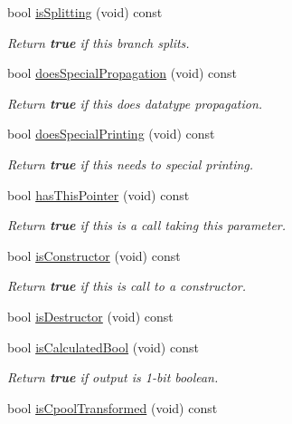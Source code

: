 \begin{DoxyCompactItemize}
bool \mbox{\hyperlink{class_pcode_op_a3a3c03bf005cafa3f295251b742423b4}{is\+Splitting}} (void) const
\begin{DoxyCompactList}\small\item\em Return {\bfseries{true}} if this branch splits. \end{DoxyCompactList}\item 
bool \mbox{\hyperlink{class_pcode_op_a746fabce57a6add33b424b291954f1f8}{does\+Special\+Propagation}} (void) const
\begin{DoxyCompactList}\small\item\em Return {\bfseries{true}} if this does datatype propagation. \end{DoxyCompactList}\item 
bool \mbox{\hyperlink{class_pcode_op_a71b48612b17f981218d84fd105b42223}{does\+Special\+Printing}} (void) const
\begin{DoxyCompactList}\small\item\em Return {\bfseries{true}} if this needs to special printing. \end{DoxyCompactList}\item 
bool \mbox{\hyperlink{class_pcode_op_a9f12117eb8561e7926ab04fdf2a05073}{has\+This\+Pointer}} (void) const
\begin{DoxyCompactList}\small\item\em Return {\bfseries{true}} if this is a call taking \textquotesingle{}this\textquotesingle{} parameter. \end{DoxyCompactList}\item 
bool \mbox{\hyperlink{class_pcode_op_a3e4c697ce7f00268e011b74ab5d2cdb4}{is\+Constructor}} (void) const
\begin{DoxyCompactList}\small\item\em Return {\bfseries{true}} if this is call to a constructor. \end{DoxyCompactList}\item 
bool \mbox{\hyperlink{class_pcode_op_a57ba899d2f042f271f0fc354e7339b29}{is\+Destructor}} (void) const
\item 
bool \mbox{\hyperlink{class_pcode_op_a8ed2d631209bc616d0cccf20e2f2577a}{is\+Calculated\+Bool}} (void) const
\begin{DoxyCompactList}\small\item\em Return {\bfseries{true}} if output is 1-\/bit boolean. \end{DoxyCompactList}\item 
bool \mbox{\hyperlink{class_pcode_op_a66b920931eba37661c8b21ef18af4d2e}{is\+Cpool\+Transformed}} (void) const

\end{DoxyCompactItemize}
